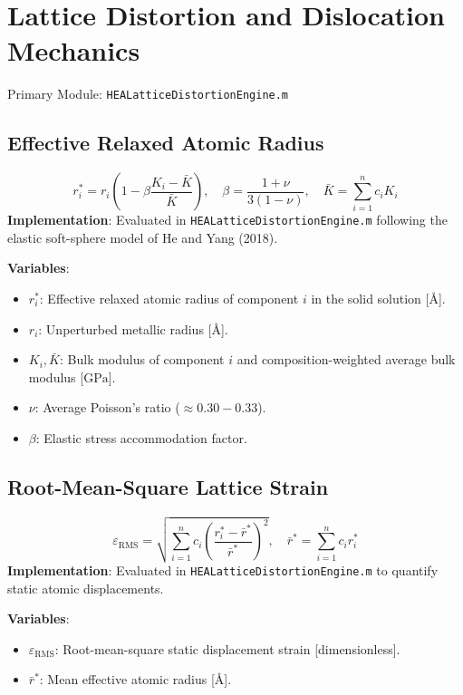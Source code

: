 \documentclass[11pt,a4paper]{article}
\begin{document}
\section{Lattice Distortion and Dislocation Mechanics}
Primary Module: \texttt{HEALatticeDistortionEngine.m}

\subsection{Effective Relaxed Atomic Radius}
\begin{equation}
r_i^* = r_i \left(1 - \beta \frac{K_i - \bar{K}}{\bar{K}}\right), \quad \beta = \frac{1 + \nu}{3(1 - \nu)}, \quad \bar{K} = \sum_{i=1}^n c_i K_i
\end{equation}
\textbf{Implementation}: Evaluated in \texttt{HEALatticeDistortionEngine.m} following the elastic soft-sphere model of He and Yang (2018).

\noindent\textbf{Variables}:
\begin{itemize}
  \item $r_i^*$: Effective relaxed atomic radius of component $i$ in the solid solution [$\text{\AA}$].
  \item $r_i$: Unperturbed metallic radius [$\text{\AA}$].
  \item $K_i, \bar{K}$: Bulk modulus of component $i$ and composition-weighted average bulk modulus [$\text{GPa}$].
  \item $\nu$: Average Poisson's ratio ($\approx 0.30 - 0.33$).
  \item $\beta$: Elastic stress accommodation factor.
\end{itemize}

\subsection{Root-Mean-Square Lattice Strain}
\begin{equation}
\varepsilon_{\text{RMS}} = \sqrt{\sum_{i=1}^n c_i \left(\frac{r_i^* - \bar{r}^*}{\bar{r}^*}\right)^2}, \quad \bar{r}^* = \sum_{i=1}^n c_i r_i^*
\end{equation}
\textbf{Implementation}: Evaluated in \texttt{HEALatticeDistortionEngine.m} to quantify static atomic displacements.

\noindent\textbf{Variables}:
\begin{itemize}
  \item $\varepsilon_{\text{RMS}}$: Root-mean-square static displacement strain [dimensionless].
  \item $\bar{r}^*$: Mean effective atomic radius [$\text{\AA}$].
\end{itemize}
\end{document}
